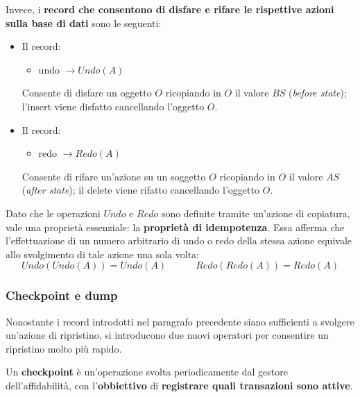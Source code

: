 \documentclass[a4paper]{article}
\begin{document}
	\noindent
	Invece, i \textbf{record che consentono di disfare e rifare le rispettive azioni sulla base di dati} sono le seguenti:
	\begin{itemize}
		\item Il record:
		\begin{itemize}
			\item \textsf{undo} $\longrightarrow Undo\left(A\right)$
		\end{itemize}
		Consente di disfare un oggetto $O$ ricopiando in $O$ il valore $BS$ (\emph{before state}); l'\textsf{insert} viene disfatto cancellando l'oggetto $O$.
		
		\item Il record:
		\begin{itemize}
			\item \textsf{redo} $\longrightarrow Redo\left(A\right)$
		\end{itemize}
		Consente di rifare un'azione su un soggetto $O$ ricopiando in $O$ il valore $AS$ (\emph{after state}); il \textsf{delete} viene rifatto cancellando l'oggetto $O$.
	\end{itemize}
	Dato che le operazioni $Undo$ e $Redo$ sono definite tramite un'azione di copiatura, vale una proprietà essenziale: la \textcolor{Red3}{\textbf{proprietà di idempotenza}}. Essa afferma che l'effettuazione di un numero arbitrario di undo o redo della stessa azione equivale allo svolgimento di tale azione una sola volta:
	\begin{equation*}
		Undo\left(Undo\left(A\right)\right) = Undo\left(A\right) \hspace{3em} Redo\left(Redo\left(A\right)\right) = Redo\left(A\right)
	\end{equation*}\newpage
	
	\subsubsection{Checkpoint e dump}
	
	Nonostante i record introdotti nel paragrafo precedente siano sufficienti a svolgere un'azione di ripristino, si introducono due nuovi operatori per consentire un ripristino molto più rapido.\newline
	
	\noindent
	Un \textcolor{Red3}{\textbf{checkpoint}} è un'operazione svolta periodicamente dal gestore dell'affidabilità, con l'\textbf{obbiettivo} di \textbf{registrare quali transazioni sono attive}.\newline
	
\end{document}
